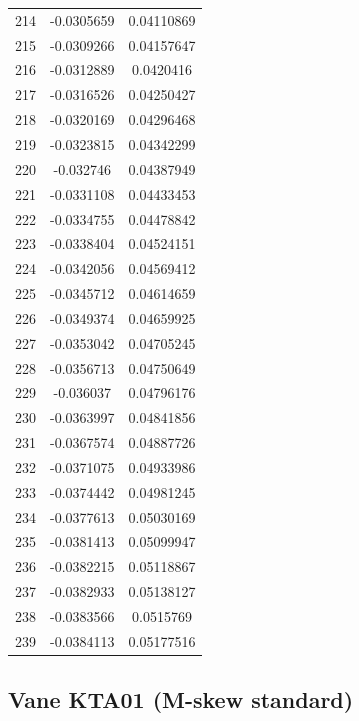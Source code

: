 \documentclass[a4paper, 11pt, oneside]{report}
\begin{document}
{\begin{longtable}{|c|c|c|}
214 & -0.0305659 & 0.04110869 \\
215 & -0.0309266 & 0.04157647 \\
216 & -0.0312889 & 0.0420416  \\
217 & -0.0316526 & 0.04250427 \\
218 & -0.0320169 & 0.04296468 \\
219 & -0.0323815 & 0.04342299 \\
220 & -0.032746  & 0.04387949 \\
221 & -0.0331108 & 0.04433453 \\
222 & -0.0334755 & 0.04478842 \\
223 & -0.0338404 & 0.04524151 \\
224 & -0.0342056 & 0.04569412 \\
225 & -0.0345712 & 0.04614659 \\
226 & -0.0349374 & 0.04659925 \\
227 & -0.0353042 & 0.04705245 \\
228 & -0.0356713 & 0.04750649 \\
229 & -0.036037  & 0.04796176 \\
230 & -0.0363997 & 0.04841856 \\
231 & -0.0367574 & 0.04887726 \\
232 & -0.0371075 & 0.04933986 \\
233 & -0.0374442 & 0.04981245 \\
234 & -0.0377613 & 0.05030169 \\
235 & -0.0381413 & 0.05099947 \\
236 & -0.0382215 & 0.05118867 \\
237 & -0.0382933 & 0.05138127 \\
238 & -0.0383566 & 0.0515769  \\
239 & -0.0384113 & 0.05177516 \\
\hline
\end{longtable}
\unskip
\unpenalty
\unpenalty}

\begin{multicols}{2}
\unvbox\ltmcbox
\end{multicols}

\subsection{Vane KTA01 (M-skew standard)}
\end{document}
